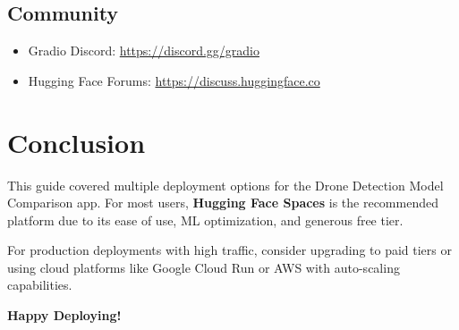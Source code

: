 \documentclass[11pt,a4paper]{article}
\begin{document}
\subsection{Community}
\begin{itemize}
    \item Gradio Discord: \url{https://discord.gg/gradio}
    \item Hugging Face Forums: \url{https://discuss.huggingface.co}
\end{itemize}

\section{Conclusion}

This guide covered multiple deployment options for the Drone Detection Model Comparison app. For most users, \textbf{Hugging Face Spaces} is the recommended platform due to its ease of use, ML optimization, and generous free tier.

For production deployments with high traffic, consider upgrading to paid tiers or using cloud platforms like Google Cloud Run or AWS with auto-scaling capabilities.

\vspace{1cm}
\noindent\textbf{Happy Deploying!}
\end{document}
